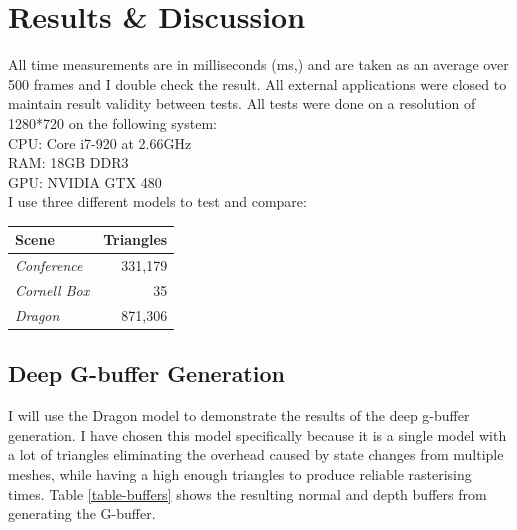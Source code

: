 \chapter{Results \& Discussion}
All time measurements are in milliseconds (ms,) and are taken as an average over 500 frames and I double check the result. All external applications were closed to maintain result validity between tests. All tests were done on a resolution of 1280*720 on the following system:\\
CPU: Core i7-920 at 2.66GHz\\
RAM: 18GB DDR3\\
GPU: NVIDIA GTX 480\\

I use three different models to test and compare:

\begin{tabular}{| l | r |}
\hline
Scene & Triangles \\
\hline
\emph{Conference} &  331,179 \\
\hline
\emph{Cornell Box} & 35 \\
\hline
\emph{Dragon} &  871,306\\
\hline
\end{tabular}

\section{Deep G-buffer Generation}
I will use the Dragon model to demonstrate the results of the deep g-buffer generation. I have chosen this model specifically because it is a single model with a lot of triangles eliminating the overhead caused by state changes from multiple meshes, while having a high enough triangles to produce reliable rasterising times. Table \ref{table-buffers} shows the resulting normal and depth buffers from generating the G-buffer.

